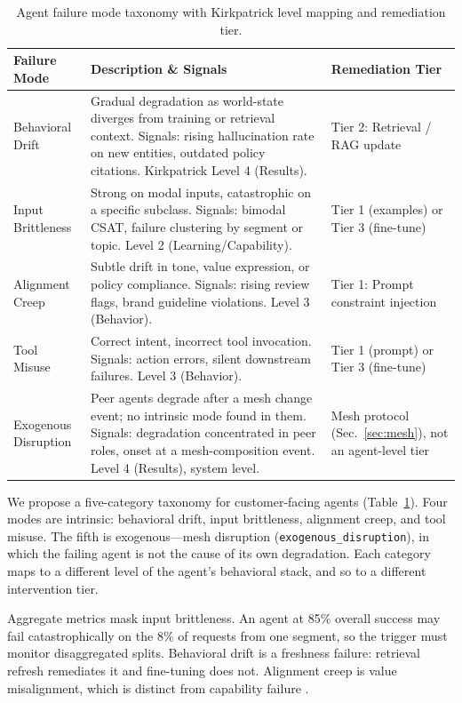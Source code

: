 \documentclass[conference]{IEEEtran}
\newcommand{\code}[1]{\texttt{\small #1}}
\begin{document}
\begin{table}[t]
\caption{Agent failure mode taxonomy with Kirkpatrick level mapping and
remediation tier.}
\label{tab:taxonomy}
\centering
\scriptsize
\begin{tabular}{@{}p{1.4cm}p{4.1cm}p{1.7cm}@{}}
\toprule
\textbf{Failure Mode} & \textbf{Description \& Signals} & \textbf{Remediation
Tier} \\
\midrule
Behavioral Drift &
Gradual degradation as world-state diverges from training or retrieval context.
Signals: rising hallucination rate on new entities, outdated policy citations.
Kirkpatrick Level 4 (Results). &
Tier 2: Retrieval / RAG update \\
\addlinespace
Input Brittleness &
Strong on modal inputs, catastrophic on a specific subclass. Signals: bimodal
CSAT, failure clustering by segment or topic. Level 2 (Learning/Capability). &
Tier 1 (examples) or Tier 3 (fine-tune) \\
\addlinespace
Alignment Creep &
Subtle drift in tone, value expression, or policy compliance. Signals: rising
review flags, brand guideline violations. Level 3 (Behavior). &
Tier 1: Prompt constraint injection \\
\addlinespace
Tool Misuse &
Correct intent, incorrect tool invocation. Signals: action errors, silent
downstream failures. Level 3 (Behavior). &
Tier 1 (prompt) or Tier 3 (fine-tune) \\
\addlinespace
Exogenous Disruption &
Peer agents degrade after a mesh change event; no intrinsic mode found in them.
Signals: degradation concentrated in peer roles, onset at a mesh-composition
event. Level 4 (Results), system level. &
Mesh protocol (Sec.~\ref{sec:mesh}), not an agent-level tier \\
\bottomrule
\end{tabular}
\end{table}

We propose a five-category taxonomy for customer-facing agents
(Table~\ref{tab:taxonomy}). Four modes are intrinsic: behavioral drift, input
brittleness, alignment creep, and tool misuse. The fifth is exogenous---mesh
disruption (\code{exogenous\_disruption}), in which the failing agent is not
the cause of its own degradation. Each category maps to a different level
of the agent's behavioral stack, and so to a different intervention tier.

Aggregate metrics mask input brittleness. An agent at 85\% overall success may
fail catastrophically on the 8\% of requests from one segment, so the trigger
must monitor disaggregated splits. Behavioral drift is a freshness failure:
retrieval refresh remediates it and fine-tuning does not. Alignment creep is
value misalignment, which is distinct from capability failure
\cite{hendrycks2021}.
\end{document}
